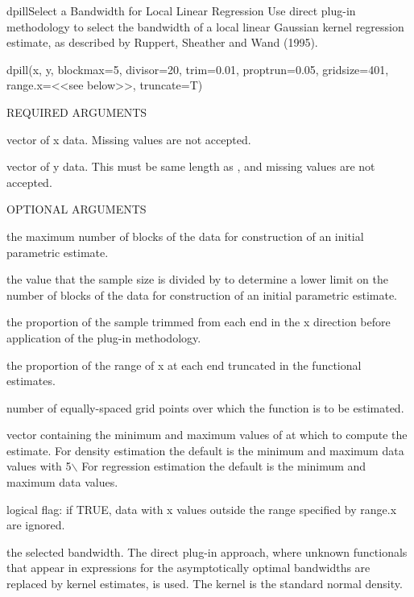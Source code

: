\begin{Helpfile}{dpill}{Select a Bandwidth for Local Linear Regression}
Use direct plug-in methodology to select the bandwidth
of a local linear Gaussian kernel regression estimate, as described
by Ruppert, Sheather and Wand (1995). 
\begin{Example}
dpill(x, y, blockmax=5, divisor=20, trim=0.01, proptrun=0.05, 
      gridsize=401, range.x=<<see below>>, truncate=T)
\end{Example}
\begin{Argument}{REQUIRED ARGUMENTS}
\item[\Co{x:}]
vector of x data.
Missing values are not accepted.
\item[\Co{y:}]
vector of y data.
This must be same length as , and
missing values are not accepted.
\end{Argument}
\begin{Argument}{OPTIONAL ARGUMENTS}
\item[\Co{blockmax:}]
the maximum number of blocks of the data for construction
of an initial parametric estimate. 
\item[\Co{divisor:}]
the value that the sample size is divided by to determine
a lower limit on the number of blocks of the data for
construction of an initial parametric estimate.
\item[\Co{trim:}]
the proportion of the sample trimmed from each end in the
x direction before application of the plug-in methodology.
\item[\Co{proptrun:}]
the proportion of the range of x at each end truncated in the
functional estimates.
\item[\Co{gridsize:}]
number of equally-spaced grid points over which the
function is to be estimated.
\item[\Co{range.x:}]
vector containing the minimum and maximum values of  at which to
compute the estimate.
For density estimation the default is the minimum and maximum data values
with 5\(\backslash\)%
For regression estimation the default is the minimum and maximum data values.
\item[\Co{truncate:}]
logical flag: if TRUE, data with x values outside the range specified
by range.x are ignored.
\end{Argument}
the selected bandwidth.
The direct plug-in approach, where unknown functionals
that appear in expressions for the asymptotically
optimal bandwidths
are replaced by kernel estimates, is used.
The kernel is the standard normal density.

\end{Helpfile}
